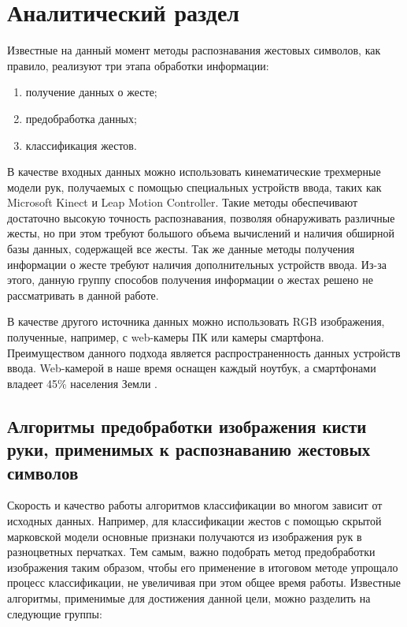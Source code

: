 \chapter{Аналитический раздел}
\label{cha:analysis}

Известные на данный момент методы распознавания жестовых символов, как правило, реализуют три этапа обработки информации:

\begin{enumerate}
	\item получение данных о жесте;
	\item предобработка данных;
	\item классификация жестов.
\end{enumerate}

В качестве входных данных можно использовать кинематические трехмерные модели рук, получаемых с помощью специальных устройств ввода, таких как Microsoft Kinect\cite{Wang} и Leap Motion Controller\cite{Mohandes}. Такие методы обеспечивают достаточно высокую точность распознавания, позволяя обнаруживать различные жесты, но при этом требуют большого объема вычислений и наличия обширной базы данных, содержащей все жесты. Так же данные методы получения информации о жесте требуют наличия дополнительных устройств ввода. Из-за этого, данную группу способов получения информации о жестах решено не рассматривать в данной работе.

В качестве другого источника данных можно использовать RGB изображения, полученные, например, с web-камеры ПК или камеры смартфона. Преимуществом данного подхода является распространенность данных устройств ввода. Web-камерой в наше время оснащен каждый ноутбук, а смартфонами владеет 45\% населения Земли \cite{smartfones}.

\section{Алгоритмы предобработки изображения кисти руки, применимых к распознаванию жестовых символов}

Скорость и качество работы алгоритмов классификации во многом зависит от исходных данных. Например, для классификации жестов с помощью скрытой марковской модели\cite{Zhang} основные признаки получаются из изображения рук в разноцветных перчатках. Тем самым, важно подобрать метод предобработки изображения таким образом, чтобы его применение в итоговом методе упрощало процесс классификации, не увеличивая при этом общее время работы. Известные алгоритмы, применимые для достижения данной цели, можно разделить на следующие группы:

